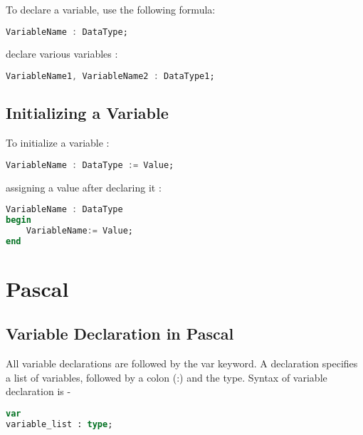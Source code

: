 \documentclass[12pt]{article}
\begin{document}
To declare a variable, use the following formula:

\lstset{style=mystyle}
\begin{lstlisting}[language=Ada, caption=Ada example]
VariableName : DataType;
\end{lstlisting}


declare various variables :

\lstset{style=mystyle}
\begin{lstlisting}[language=Ada, caption=Ada example]
VariableName1, VariableName2 : DataType1;
\end{lstlisting}



\subsection{Initializing a Variable}


To initialize a variable :


\lstset{style=mystyle}
\begin{lstlisting}[language=Ada, caption=Ada example]
VariableName : DataType := Value;
\end{lstlisting}



assigning a value after declaring it :


\lstset{style=mystyle}
\begin{lstlisting}[language=Ada, caption=Ada example]
VariableName : DataType
begin
    VariableName:= Value;
end
\end{lstlisting}


\newpage

\section{Pascal}


\subsection{Variable Declaration in Pascal}

All variable declarations are followed by the var keyword. A declaration specifies a list of variables, followed by a colon (:) and the type. Syntax of variable declaration is -


\lstset{style=mystyle}
\begin{lstlisting}[language=Pascal, caption=Pascal example]
var
variable_list : type;
\end{lstlisting}
\end{document}
